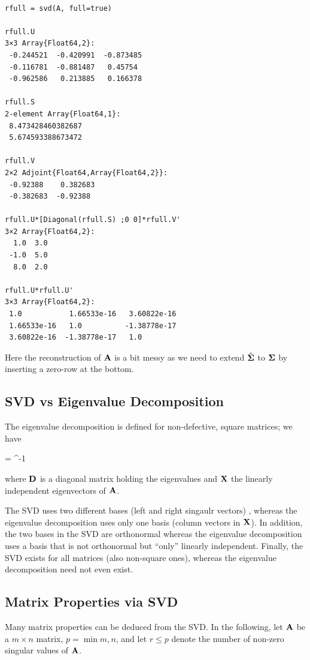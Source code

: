 \begin{verbatim}

rfull = svd(A, full=true)

rfull.U
3×3 Array{Float64,2}:
 -0.244521  -0.420991  -0.873485
 -0.116781  -0.881487   0.45754 
 -0.962586   0.213885   0.166378

rfull.S
2-element Array{Float64,1}:
 8.473428460382687
 5.674593388673472

rfull.V
2×2 Adjoint{Float64,Array{Float64,2}}:
 -0.92388    0.382683
 -0.382683  -0.92388 

rfull.U*[Diagonal(rfull.S) ;0 0]*rfull.V'
3×2 Array{Float64,2}:
  1.0  3.0
 -1.0  5.0
  8.0  2.0

rfull.U*rfull.U'
3×3 Array{Float64,2}:
 1.0           1.66533e-16   3.60822e-16
 1.66533e-16   1.0          -1.38778e-17
 3.60822e-16  -1.38778e-17   1.0 

\end{verbatim}

Here the reconstruction of $\mathbf{A}$ is a bit messy as we need to extend $\hat{\mathbf{\Sigma}}$ to $\mathbf{\Sigma}$ by inserting a zero-row at the bottom.

\subsection{SVD vs Eigenvalue Decomposition}

The eigenvalue decomposition is defined for non-defective, square matrices; we have

\bee
\Abf = \Xbf \Dbf \Xbf^{-1}
\eee

where $\mathbf{D}$ is a diagonal matrix holding the eigenvalues and $\mathbf{X}$ the linearly independent eigenvectors of $\mathbf{A}$.

The SVD uses two different bases (left and right singaulr vectors) , whereas the eigenvalue decomposition uses only one basis (column vectors in $\mathbf{X}$). In addition, the two bases in the SVD are orthonormal whereas the eigenvalue decomposition uses a basis that is not orthonormal but ``only'' linearly independent. Finally, the SVD exists for all matrices (also non-square ones), whereas the eigenvalue decomposition need not even exist.

\subsection{Matrix Properties via SVD}

Many matrix properties can be deduced from the SVD. In the following, let $\mathbf{A}$ be a $m \times n$ matrix, $p = \min m,n$, and let $r \leq p$ denote the number of non-zero singular values of $\mathbf{A}$.

